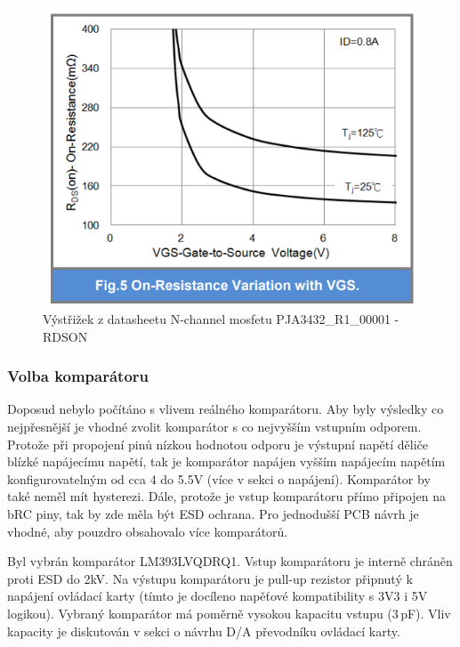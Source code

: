 \begin{figure}[ht!]
\centering
\includegraphics[height = 0.25\textheight]{obrazky/Nmosfet_datasheet.png}
\caption{Výstřižek z datasheetu N-channel mosfetu PJA3432\_R1\_00001 - RDSON\cite{NMOS_datasheet}}
\label{fig:Výstřižek z datasheetu N-channel mosfetu}
\end{figure}

\subsubsection{Volba komparátoru}
Doposud nebylo počítáno s vlivem reálného komparátoru.
Aby byly výsledky co nejpřesnější je vhodné zvolit komparátor s co nejvyšším vstupním odporem.
Protože při propojení pinů nízkou hodnotou odporu je výstupní napětí děliče blízké napájecímu napětí, tak je komparátor
napájen vyšším napájecím napětím konfigurovatelným od cca 4 do 5.5V (více v sekci o napájení).
Komparátor by také neměl mít hysterezi. Dále, protože je vstup komparátoru přímo připojen
na bRC piny, tak by zde měla být ESD ochrana. Pro jednodušší PCB návrh je vhodné, aby pouzdro obsahovalo více komparátorů.\par

Byl vybrán komparátor LM393LVQDRQ1. Vstup komparátoru je interně chráněn proti ESD do 2kV.
Na výstupu komparátoru je pull-up rezistor připnutý k napájení
ovládací karty (tímto je docíleno napěťové kompatibility s 3V3 i 5V logikou).
Vybraný komparátor má poměrně vysokou kapacitu vstupu (3\,pF).
Vliv kapacity je diskutován v sekci o návrhu D/A převodníku ovládací karty\cite{comp_datasheet}.


